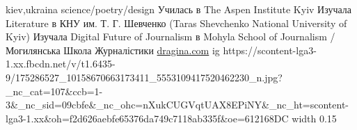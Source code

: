  
 
 
 
 

\par
kiev,ukraina
science/poetry/design
Училась в The Aspen Institute Kyiv
Изучала Literature в КНУ им. Т. Г. Шевченко (Taras Shevchenko National University of Kyiv)
Изучала Digital Future of Journalism в Mohyla School of Journalism / Могилянська Школа Журналістики
\url{dragina.com}
\ifcmt
  ig https://scontent-lga3-1.xx.fbcdn.net/v/t1.6435-9/175286527_10158670663173411_5553109417520462230_n.jpg?_nc_cat=107&ccb=1-3&_nc_sid=09cbfe&_nc_ohc=nXukCUGVqtUAX8EPiNY&_nc_ht=scontent-lga3-1.xx&oh=f2d626aebfe65376da749c7118ab335f&oe=612168DC
  width 0.15
\fi

